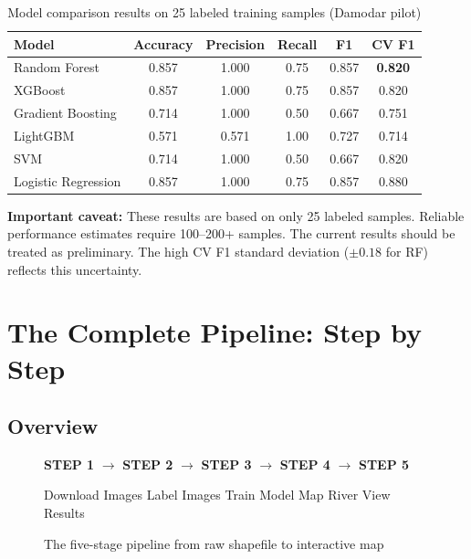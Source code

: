 \documentclass[12pt, a4paper]{article}
\begin{document}
\begin{table}[H]
\centering
\begin{tabular}{lccccc}
\toprule
\textbf{Model} & \textbf{Accuracy} & \textbf{Precision} & \textbf{Recall} & \textbf{F1} & \textbf{CV F1} \\
\midrule
Random Forest & 0.857 & 1.000 & 0.75 & 0.857 & \textbf{0.820} \\
XGBoost & 0.857 & 1.000 & 0.75 & 0.857 & 0.820 \\
Gradient Boosting & 0.714 & 1.000 & 0.50 & 0.667 & 0.751 \\
LightGBM & 0.571 & 0.571 & 1.00 & 0.727 & 0.714 \\
SVM & 0.714 & 1.000 & 0.50 & 0.667 & 0.820 \\
Logistic Regression & 0.857 & 1.000 & 0.75 & 0.857 & 0.880 \\
\bottomrule
\end{tabular}
\caption{Model comparison results on 25 labeled training samples (Damodar pilot)}
\end{table}

\begin{notebox}
  \textbf{Important caveat:} These results are based on only 25 labeled
  samples. Reliable performance estimates require 100--200+ samples.
  The current results should be treated as preliminary. The high CV F1
  standard deviation ($\pm 0.18$ for RF) reflects this uncertainty.
\end{notebox}

\section{The Complete Pipeline: Step by Step}

\subsection{Overview}

\begin{figure}[H]
\centering
\begin{tcolorbox}[colback=lightblue!15, colframe=darkblue, width=\textwidth]
\centering
\large
\textbf{STEP 1} \quad $\longrightarrow$ \quad
\textbf{STEP 2} \quad $\longrightarrow$ \quad
\textbf{STEP 3} \quad $\longrightarrow$ \quad
\textbf{STEP 4} \quad $\longrightarrow$ \quad
\textbf{STEP 5}

\normalsize\vspace{0.3em}
Download Images \quad Label Images \quad Train Model \quad Map River \quad View Results
\end{tcolorbox}
\caption{The five-stage pipeline from raw shapefile to interactive map}
\end{figure}
\end{document}
